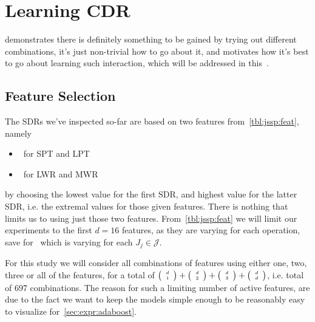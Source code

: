 \documentclass[smallextended]{svjour3}
\begin{document}
\begin{comment}
\begin{figure}
\centering
\texttt{[image: figures/\{j.rnd]}/{trdat.prob.moveIsOptimal.10x10.feat.minmax}.pdf}
\caption{Probability of extremal feature being optimal for \jrnd}
\label{fig:j.rnd:opt:minmax}
\end{figure}
\begin{figure}
\centering
\texttt{[image: figures/\{j.rndn]}/{trdat.prob.moveIsOptimal.10x10.feat.minmax}.pdf}
\caption{Probability of extremal feature being optimal for \jrndn}
\label{fig:j.rndn:opt:minmax}
\end{figure}

\begin{figure}
\centering
\texttt{[image: figures/\{f.rnd]}/{trdat.prob.moveIsOptimal.10x10.feat.minmax}.pdf}
\caption{Probability of extremal feature being optimal for \frnd}
\label{fig:f.rnd:opt:minmax}
\end{figure}
\end{comment}

\section{Learning CDR}\label{ch:expr:CDR}
 demonstrates there is definitely something to be gained by trying out different combinations, it's just non-trivial how to go about it, and motivates how it's best to go about learning such interaction, which will be addressed in this~.

\subsection{Feature Selection}
The SDRs we've inspected so-far are based on two features from~\cref{tbl:jssp:feat}, namely
\begin{itemize}
\item \phiproc\ for SPT and LPT 
\item \phiwrmJob\ for LWR and MWR 
\end{itemize}
by choosing the lowest value for the first SDR, and highest value for the latter SDR, i.e. the extremal values for those given features. 
There is nothing that limits us to using just those two features. 
From~\cref{tbl:jssp:feat} we will limit our experiments to the first $d=16$ features, as they are varying for each operation, save for \phitotalProc\ which is varying for each $J_j\in\mathcal{J}$. 

For this study we will consider all combinations of features using either one, two, three or all of the features, for a total of $\tiny \left(\begin{array}{c}d\\1\end{array}\right)+\tiny \left(\begin{array}{c}d\\2\end{array}\right)+\tiny \left(\begin{array}{c}d\\3\end{array}\right)+\tiny \left(\begin{array}{c}d\\d\end{array}\right)$, i.e. total of 697 combinations. The reason for such a limiting number of active features, are due to the fact we want to keep the models simple enough to be reasonably easy to visualize for~\cref{sec:expr:adaboost}. %
\end{document}
